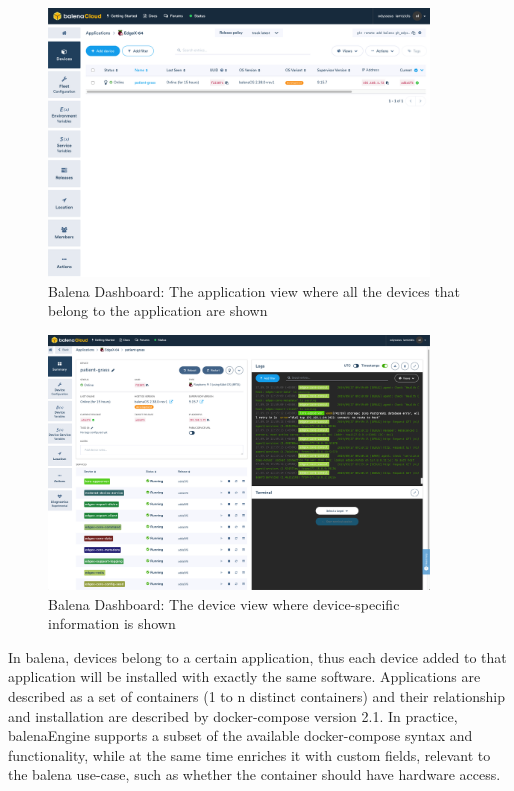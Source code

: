 \begin{figure}[H]
    \centering
    \includegraphics[width=0.9\textwidth]{images/balena_apps.png}
    \caption{Balena Dashboard: The application view where all the devices that belong to the application are shown}
    \label{fig:balena_app}
\end{figure}\begin{figure}[H]
    \centering
    \includegraphics[width=0.9\textwidth]{images/balena_device.png}
    \caption{Balena Dashboard: The device view where device-specific information is shown}
    \label{fig:balena_device}
\end{figure}

In balena, devices belong to a certain application, thus each device added to that application will be installed with exactly the same software. Applications are described as a set of containers (1 to n distinct containers) and their relationship and installation are described by docker-compose version 2.1. In practice, balenaEngine supports a subset of the available docker-compose syntax and functionality, while at the same time enriches it with custom fields, relevant to the balena use-case, such as whether the container should have hardware access. 

